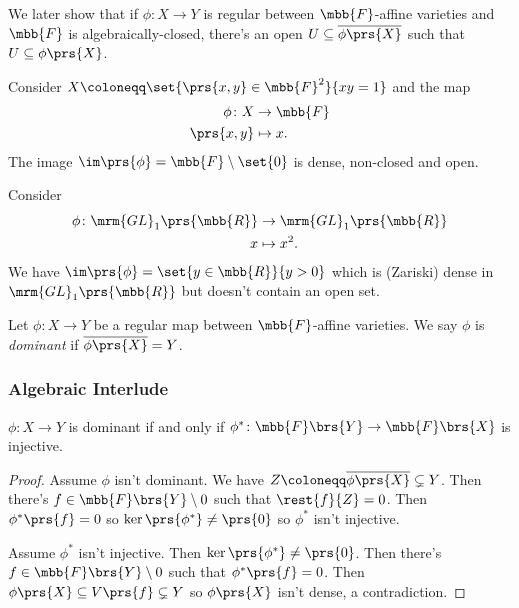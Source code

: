 \documentclass[10pt,a4paper,twoside,openany,hidelinks]{book}
\begin{document}
We later show that if $\phi \colon X \to Y$ is regular between $\mbb{F}$-affine varieties and $\mbb{F}$ is algebraically-closed, there's an open $U \subseteq \overline{\phi\prs{X}}$ such that $U \subseteq \phi\prs{X}$.

\begin{example}
Consider $X \coloneqq \set{\prs{x,y} \in \mbb{F}^2}{xy = 1}$ and the map
\begin{align*}
\phi \colon X &\to \mbb{F} \\
\prs{x,y} &\mapsto x \text{.}
\end{align*}
The image $\im\prs{\phi} = \mbb{F} \setminus \set{0}$ is dense, non-closed and open.
\end{example}

\begin{example}
Consider
\begin{align*}
\phi \colon \mrm{GL}_1\prs{\mbb{R}} &\to \mrm{GL}_1\prs{\mbb{R}} \\
x &\mapsto x^2 \text{.}
\end{align*}
We have $\im\prs{\phi} = \set{y \in \mbb{R}}{y > 0}$ which is (Zariski) dense in $\mrm{GL}_1\prs{\mbb{R}}$ but doesn't contain an open set.
\end{example}

\begin{definition}
Let $\phi \colon X \to Y$ be a regular map between $\mbb{F}$-affine varieties. We say $\phi$ is \emph{dominant} if $\overline{\phi\prs{X}} = Y$.
\end{definition}

\subsubsection{Algebraic Interlude}

\begin{proposition}\label{proposition:dominant-injective}
$\phi \colon X \to Y$ is dominant if and only if $\phi^* \colon \mbb{F}\brs{Y} \to \mbb{F}\brs{X}$ is injective.
\end{proposition}

\begin{proof}
Assume $\phi$ isn't dominant. We have $Z \coloneqq \overline{\phi\prs{X}} \subsetneq Y$.
Then there's $f \in \mbb{F}\brs{Y} \setminus 0$ such that $\rest{f}{Z} = 0$. Then $\phi^*\prs{f} = 0$ so $\ker\prs{\phi^*} \neq \prs{0}$ so $\phi^*$ isn't injective.

Assume $\phi^*$ isn't injective. Then $\ker\prs{\phi^*} \neq \prs{0}$. Then there's $f \in \mbb{F}\brs{Y} \setminus 0$ such that $\phi^*\prs{f} = 0$. Then $\phi\prs{X} \subseteq V\prs{f} \subsetneq Y$ so $\phi\prs{X}$ isn't dense, a contradiction.
\end{proof}
\end{document}
